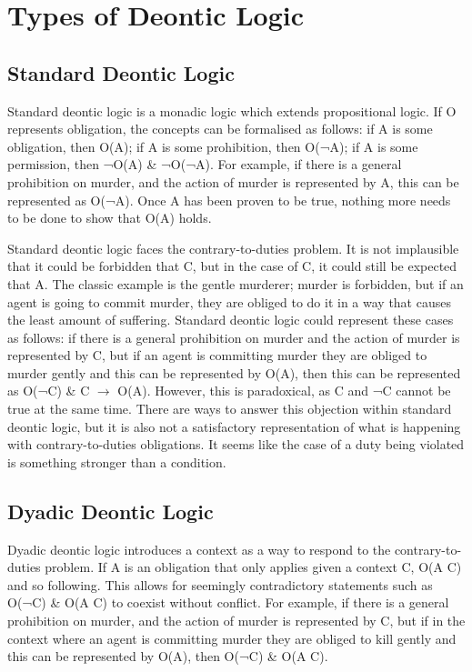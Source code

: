 \documentclass{l4proj}
\begin{document}
\section{Types of Deontic Logic}%

\subsection{Standard Deontic Logic}%
Standard deontic logic is a monadic logic which extends propositional logic. If O represents obligation, the concepts can be formalised as follows: if A is some obligation, then O(A); if A is some prohibition, then O(¬A); if A is some permission, then ¬O(A) \& ¬O(¬A). For example, if there is a general prohibition on murder, and the action of murder is represented by A, this can be represented as O(¬A). Once A has been proven to be true, nothing more needs to be done to show that O(A) holds. 

Standard deontic logic faces the contrary-to-duties problem. It is not implausible that it could be forbidden that C, but in the case of C, it could still be expected that A. The classic example is the gentle murderer; murder is forbidden, but if an agent is going to commit murder, they are obliged to do it in a way that causes the least amount of suffering. Standard deontic logic could represent these cases as follows: if there is a general prohibition on murder and the action of murder is represented by C, but if an agent is committing murder they are obliged to murder gently and this can be represented by O(A), then this can be represented as O(¬C) \& C \( \to \) O(A). However, this is paradoxical, as C and ¬C cannot be true at the same time. There are ways to answer this objection within standard deontic logic, but it is also not a satisfactory representation of what is happening with contrary-to-duties obligations. It seems like the case of a duty being violated is something stronger than a condition. 

\subsection{Dyadic Deontic Logic}%
Dyadic deontic logic introduces a context as a way to respond to the contrary-to-duties problem. If A is an obligation that only applies given a context C, O(A \textbar C) and so following. This allows for seemingly contradictory statements such as O(¬C) \& O(A \textbar C) to coexist without conflict. For example, if there is a general prohibition on murder, and the action of murder is represented by C, but if in the context where an agent is committing murder they are obliged to kill gently and this can be represented by O(A), then O(¬C) \& O(A \textbar C).
\end{document}
